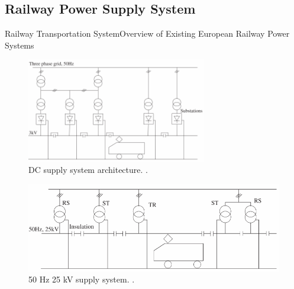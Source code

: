 \subsection{Railway Power Supply System}


\begin{frame}{Railway Transportation System}{Overview of Existing European Railway Power Systems}
	\begin{minipage}[t]{0.48\linewidth}
	
	\begin{figure}[ht!]
		\centering
		\includegraphics[width=0.7\textwidth,keepaspectratio]{figures/31.PowerS/abad2016f}
		\caption{\ac{DC} supply system architecture. \cite{abad2016}.}
	\end{figure}
\end{minipage}\hfill
\begin{minipage}[t]{0.48\linewidth}
	
	
	\begin{figure}[ht!]
		\centering
		\includegraphics[width=\textwidth,keepaspectratio]{figures/31.PowerS/abad2016d}
		\caption{50 Hz 25 kV supply system. \cite{abad2016}.}
	\end{figure}


\end{minipage}
\end{frame}
